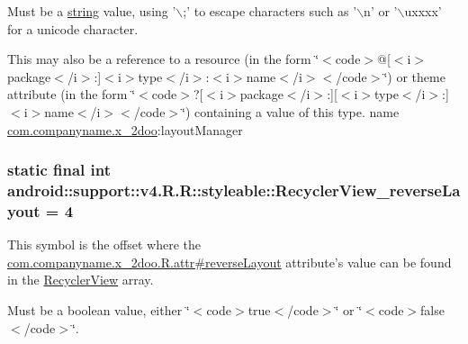 Must be a \hyperlink{classandroid_1_1support_1_1v4_1_1_r_1_1string}{string} value, using '$\backslash$;' to escape characters such as '$\backslash$n' or '$\backslash$uxxxx' for a unicode character. 

This may also be a reference to a resource (in the form \char`\"{}$<$code$>$@\mbox{[}$<$i$>$package$<$/i$>$:\mbox{]}$<$i$>$type$<$/i$>$:$<$i$>$name$<$/i$>$$<$/code$>$\char`\"{}) or theme attribute (in the form \char`\"{}$<$code$>$?\mbox{[}$<$i$>$package$<$/i$>$:\mbox{]}\mbox{[}$<$i$>$type$<$/i$>$:\mbox{]}$<$i$>$name$<$/i$>$$<$/code$>$\char`\"{}) containing a value of this type.  name \hyperlink{namespacecom_1_1companyname_1_1x__2doo}{com.companyname.x\_\-2doo}:layoutManager \hypertarget{classandroid_1_1support_1_1v4_1_1_r_1_1styleable_1e1cc171f4107ce021536bcce00230c6}{
\subsubsection[{RecyclerView\_\-reverseLayout}]{\setlength{\rightskip}{0pt plus 5cm}static final int android::support::v4.R.R::styleable::RecyclerView\_\-reverseLayout = 4}}
\label{classandroid_1_1support_1_1v4_1_1_r_1_1styleable_1e1cc171f4107ce021536bcce00230c6}


This symbol is the offset where the \hyperlink{classcom_1_1companyname_1_1x__2doo_1_1_r_1_1attr_0f2a4d7f16391293fe0ad6e314feae45}{com.companyname.x\_\-2doo.R.attr\#reverseLayout} attribute's value can be found in the \hyperlink{classandroid_1_1support_1_1v4_1_1_r_1_1styleable_2cdeae02a2aae8e03f8765ed3a43caf5}{RecyclerView} array.

Must be a boolean value, either \char`\"{}$<$code$>$true$<$/code$>$\char`\"{} or \char`\"{}$<$code$>$false$<$/code$>$\char`\"{}. 

